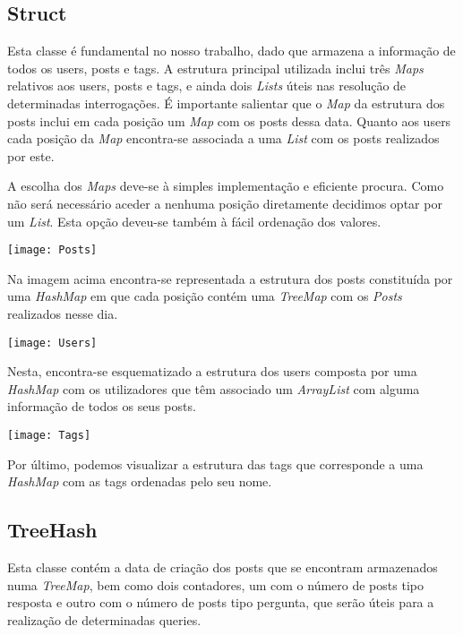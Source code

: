\documentclass[10pt,a4paper]{article}
\begin{document}
\subsection{Struct}
Esta classe é fundamental no nosso trabalho, dado que armazena a informação de todos os users, posts e tags. A estrutura principal utilizada inclui três \textit{Maps} relativos aos users, posts e tags, e ainda dois \textit{Lists} úteis nas resolução de determinadas interrogações. É importante salientar que o \textit{Map} da estrutura dos posts inclui em cada posição um \textit{Map} com os posts dessa data. Quanto aos users cada posição da \textit{Map} encontra-se associada a uma \textit{List} com os posts realizados por este. 

A escolha dos \textit{Maps} deve-se à simples implementação e eficiente procura. Como não será necessário aceder a nenhuma posição diretamente decidimos optar por um \textit{List}. Esta opção deveu-se também à fácil ordenação dos valores.

\begin{center}
\graphicspath{ {/home/jessica/Desktop/} }
\texttt{[image: Posts]}
\end{center}

Na imagem acima encontra-se representada a estrutura dos posts constituída por uma \textit{HashMap} em que cada posição contém uma \textit{TreeMap} com os \textit{Posts} realizados nesse dia.

\begin{center}
\graphicspath{ {/home/jessica/Desktop/} }
\texttt{[image: Users]}\\
\end{center}

Nesta, encontra-se esquematizado a estrutura dos users composta por uma \textit{HashMap} com os utilizadores que têm associado um \textit{ArrayList} com alguma informação de todos os seus posts.

\begin{center}
\graphicspath{ {/home/jessica/Desktop/} }
\texttt{[image: Tags]}\\
\end{center}

Por último, podemos visualizar a estrutura das tags que corresponde a uma \textit{HashMap} com as tags ordenadas pelo seu nome.

\subsection{TreeHash}
Esta classe contém a data de criação dos posts que se encontram armazenados numa \textit{TreeMap}, bem como dois contadores, um com o número de posts tipo resposta e outro com o número de posts tipo pergunta, que serão úteis para a realização de determinadas queries.
\end{document}
